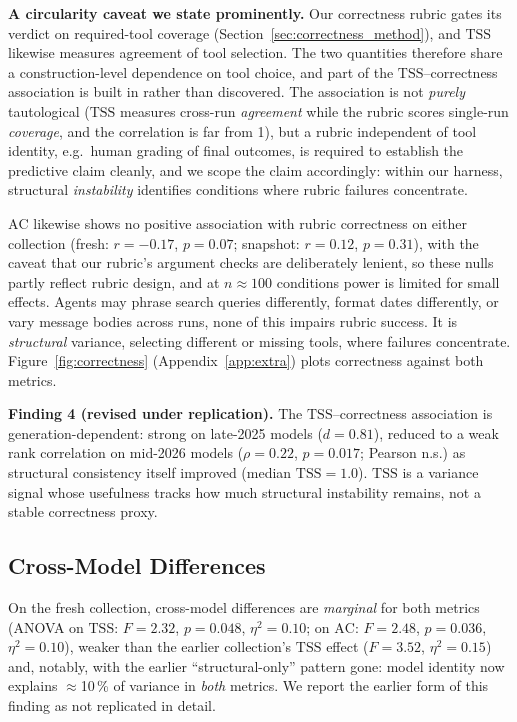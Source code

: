 \documentclass[11pt]{article}
\newcommand{\tss}{\mathrm{TSS}}
\newcommand{\ac}{\mathrm{AC}}
\newcommand{\finding}[1]{%
  \begin{mdframed}[backgroundcolor=gray!9,linewidth=0.4pt,innertopmargin=4pt,
                   innerbottommargin=4pt]
    \small #1
  \end{mdframed}}
\begin{document}
\textbf{A circularity caveat we state prominently.} Our correctness rubric
gates its verdict on required-tool coverage (Section~\ref{sec:correctness_method}),
and $\tss$ likewise measures agreement of tool selection. The two quantities
therefore share a construction-level dependence on tool choice, and part of the
$\tss$--correctness association is built in rather than discovered. The
association is not \emph{purely} tautological ($\tss$ measures cross-run
\emph{agreement} while the rubric scores single-run \emph{coverage}, and the
correlation is far from 1), but a rubric independent of tool identity, e.g.\
human grading of final outcomes, is required to establish the predictive
claim cleanly, and we scope the claim accordingly: within our harness,
structural \emph{instability} identifies conditions where rubric failures
concentrate.

$\ac$ likewise shows no positive association with rubric correctness on
either collection (fresh: $r = -0.17$, $p = 0.07$; snapshot: $r = 0.12$,
$p = 0.31$), with the caveat that our rubric's argument checks are
deliberately lenient, so these nulls partly reflect rubric design, and at
$n \approx 100$ conditions power is limited for small effects.
Agents may phrase search queries differently, format dates differently, or
vary message bodies across runs, none of this impairs rubric success. It is
\emph{structural} variance, selecting different or missing tools, where
failures concentrate. Figure~\ref{fig:correctness}
(Appendix~\ref{app:extra}) plots correctness against both metrics.

\finding{\textbf{Finding 4 (revised under replication).} The
$\tss$--correctness association is generation-dependent: strong on late-2025
models ($d = 0.81$), reduced to a weak rank correlation on mid-2026 models
($\rho = 0.22$, $p = 0.017$; Pearson n.s.) as structural consistency itself
improved (median $\tss = 1.0$). $\tss$ is a variance signal whose usefulness
tracks how much structural instability remains, not a stable correctness
proxy.}

\subsection{Cross-Model Differences}
\label{sec:model_comparison}

On the fresh collection, cross-model differences are \emph{marginal} for both
metrics (ANOVA on $\tss$: $F = 2.32$, $p = 0.048$, $\eta^2 = 0.10$; on
$\ac$: $F = 2.48$, $p = 0.036$, $\eta^2 = 0.10$), weaker than the earlier
collection's $\tss$ effect ($F = 3.52$, $\eta^2 = 0.15$) and, notably, with
the earlier ``structural-only'' pattern gone: model identity now explains
$\approx$10\,\% of variance in \emph{both} metrics. We report the earlier
form of this finding as not replicated in detail.
\end{document}
